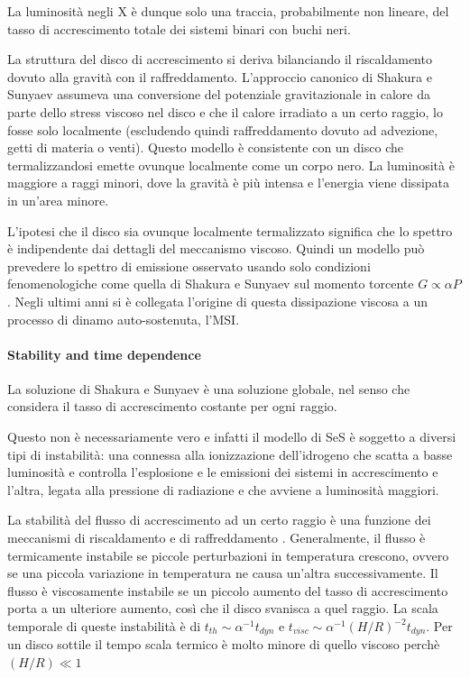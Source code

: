 \documentclass[a4paperbi]{article}
\begin{document}
	La luminosità negli X è dunque solo una traccia, probabilmente non lineare, del tasso di accrescimento totale dei sistemi binari con buchi neri.
	
	La struttura del disco di accrescimento si deriva bilanciando il riscaldamento dovuto alla gravità con il raffreddamento. L'approccio canonico di Shakura e Sunyaev assumeva una conversione del potenziale gravitazionale in calore da parte dello stress viscoso nel disco e che il calore irradiato a un certo raggio, lo fosse solo localmente (escludendo quindi raffreddamento dovuto ad advezione, getti di materia o venti). Questo modello è consistente con un disco che termalizzandosi emette ovunque localmente come un corpo nero. La luminosità è maggiore a raggi minori, dove la gravità è più intensa e l'energia viene dissipata in un'area minore.
	
	L'ipotesi che il disco sia ovunque localmente termalizzato significa che lo spettro è indipendente dai dettagli del meccanismo viscoso. Quindi un modello può prevedere lo spettro di emissione osservato usando solo condizioni fenomenologiche come quella di Shakura e Sunyaev sul momento torcente $G\propto\alpha P$. Negli ultimi anni si è collegata l'origine di questa dissipazione viscosa a un processo di dinamo auto-sostenuta, l'MSI.
	
	\paragraph{Stability and time dependence}
	La soluzione di Shakura e Sunyaev è una soluzione globale, nel senso che considera il tasso di accrescimento costante per ogni raggio.
	
	Questo non è necessariamente vero e infatti il modello di SeS è soggetto a diversi tipi di instabilità: una connessa alla ionizzazione dell'idrogeno che scatta a basse luminosità e controlla l'esplosione e le emissioni dei sistemi in accrescimento e l'altra, legata alla pressione di radiazione e che avviene a luminosità maggiori.
	
	La stabilità del flusso di accrescimento ad un certo raggio è una funzione dei meccanismi di riscaldamento e di raffreddamento
	. Generalmente, il flusso è termicamente instabile se piccole perturbazioni in temperatura crescono, ovvero se una piccola variazione in temperatura ne causa un'altra successivamente. Il flusso è viscosamente instabile se un piccolo aumento del tasso di accrescimento porta a un ulteriore aumento, così che il disco svanisca a quel raggio. La scala temporale di queste instabilità è di $t_{th}\sim \alpha^{-1}t_{dyn}$ e $t_{visc}\sim \alpha^{-1}(H/R)^{-2}t_{dyn}$. Per un disco sottile il tempo scala termico è molto minore di quello viscoso perchè $(H/R)\ll1$
\end{document}
